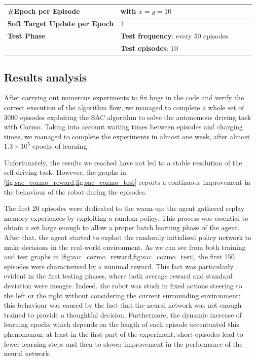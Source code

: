 \begin{table}[!h]
{\begin{tabular}{@{}lllll@{}}
			\textbf{\#Epoch per Episode}          & \Vref{eq:learning-step} with $x = y = 10$              \\\midrule
			\textbf{Soft Target Update per Epoch} & 1                                                      \\\midrule
			\textbf{Test Phase}                   & \textbf{Test frequency}: every 50 episodes             \\
			                                      & \textbf{Test episodes}: 10                             \\
			\bottomrule
		\end{tabular}}
\end{table}


\subsection{Results analysis} \label{ch5:results}

After carrying out numerous experiments to fix bugs in the code and verify the correct execution of the algorithm flow, we managed to complete a whole set of 3000 episodes exploiting the SAC algorithm to solve the autonomous driving task with Cozmo.
Taking into account waiting times between episodes and charging times, we managed to complete the experiments in almost one week, after almost $1.3\times 10^5$ epochs of learning.

Unfortunately, the results we reached have not led to a stable resolution of the self-driving task.
However, the graphs in \vref{fig:sac_cozmo_reward,fig:sac_cozmo_test} reports a continuous improvement in the behaviour of the robot during the episodes.

The first 20 episodes were dedicated to the warm-up: the agent gathered replay memory experiences by exploiting a random policy.
This process was essential to obtain a set large enough to allow a proper batch learning phase of the agent.
After that, the agent started to exploit the randomly initialised policy network to make decisions in the real-world environment.
As we can see from both training and test graphs in \vref{fig:sac_cozmo_reward,fig:sac_cozmo_test}, the first 150 episodes were characterised by a minimal reward.
This fact was particularly evident in the first testing phases, where both average reward and standard deviation were meagre.
Indeed, the robot was stuck in fixed actions steering to the left or the right without considering the current surrounding environment: this behaviour was caused by the fact that the neural network was not enough trained to provide a thoughtful decision.
Furthermore, the dynamic increase of learning epochs which depends on the length of each episode accentuated this phenomenon: at least in the first part of the experiment, short episodes lead to fewer learning steps and then to slower improvement in the performance of the neural network.


